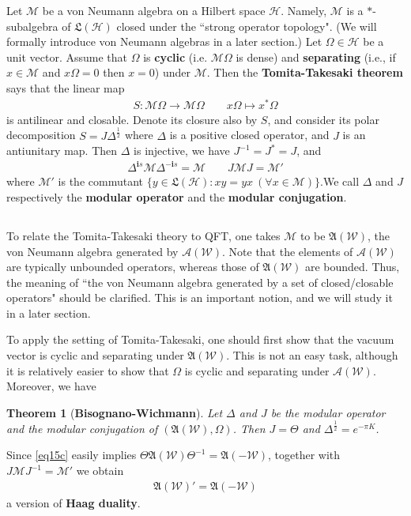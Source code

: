 \documentclass[12pt,b5paper,notitlepage]{article}
\theoremstyle{definition}
\theoremstyle{plain}
\newtheorem{thm}[df]{Theorem}
\newcommand{\fk}{\mathfrak}
\newcommand{\mc}{\mathcal}
\newcommand{\scr}{\mathscr}
\newcommand{\im}{\mathbf{i}}
\numberwithin{equation}{section}
\begin{document}
Let $\mc M$ be a von Neumann algebra on a Hilbert space $\mc H$. Namely, $\mc M$ is a $*$-subalgebra of $\fk L(\mc H)$ closed under the ``strong operator topology". (We will formally introduce von Neumann algebras in a later section.) Let $\Omega\in\mc H$ be a unit vector. Assume that $\Omega$ is \textbf{cyclic} (i.e. $\mc M\Omega$ is dense) and \textbf{separating} (i.e., if $x\in\mc M$ and $x\Omega=0$ then $x=0$) under $\mc M$. Then the \textbf{Tomita-Takesaki theorem} says that the linear map
\begin{align*}
S:\mc M\Omega\rightarrow\mc M\Omega\qquad x\Omega\mapsto x^*\Omega
\end{align*}
is antilinear and closable. Denote its closure also by $S$, and consider its polar decomposition $S=J\Delta^{\frac 12}$ where $\Delta$ is a positive closed operator, and $J$ is an antiunitary map. Then $\Delta$ is injective, we have $J^{-1}=J^*=J$, and
\begin{align*}
\Delta^{\im s}\mc M\Delta^{-\im s}=\mc M\qquad J\mc MJ=\mc M'
\end{align*}
where $\mc M'$ is the commutant $\{y\in\fk L(\mc H):xy=yx~(\forall x\in\mc M)\}$.We call $\Delta$ and $J$ respectively the \textbf{modular operator} and the \textbf{modular conjugation}.



\subsection{}



To relate the Tomita-Takesaki theory to QFT, one takes $\mc M$ to be $\fk A(\mc W)$, the von Neumann algebra generated by $\scr A(\mc W)$. Note that the elements of $\scr A(\mc W)$ are typically unbounded operators, whereas those of $\fk A(\mc W)$ are bounded. Thus, the meaning of ``the von Neumann algebra generated by a set of closed/closable operators" should be clarified. This is an important notion, and we will study it in a later section.


To apply the setting of Tomita-Takesaki, one should first show that the vacuum vector is cyclic and separating under $\fk A(\mc W)$. This is not an easy task, although it is relatively easier to show that $\Omega$ is cyclic and separating under $\scr A(\mc W)$. Moreover, we have
\begin{thm}[\textbf{Bisognano-Wichmann}]
Let $\Delta$ and $J$ be the modular operator and the modular conjugation of $(\fk A(\mc W),\Omega)$. Then $J=\Theta$ and $\Delta^{\frac 12}=e^{-\pi K}$.
\end{thm}
Since \eqref{eq15c} easily implies $\Theta\fk A(\mc W)\Theta^{-1}=\fk A(-\mc W)$, together with $J\mc M J^{-1}=\mc M'$ we obtain
\begin{align}
\fk A(\mc W)'=\fk A(-\mc W)
\end{align}
a version of \textbf{Haag duality}.
\end{document}
